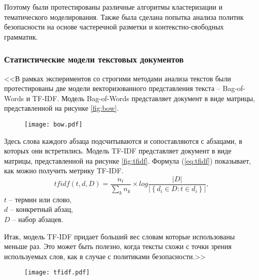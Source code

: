 \documentclass[../main]{subfiles}
\begin{document}
Поэтому были протестированы различные алгоритмы кластеризации и тематического моделирования. Также была сделана попытка анализа политик безопасности на основе частеречной разметки и контекстно-свободных грамматик.

\subsubsection{Статистические модели текстовых документов}

<<В рамках экспериментов со строгими методами анализа текстов были протестированы две модели векторизованного представления текста -- Bag-of-Words и TF-IDF. Модель Bag-of-Words представляет документ в виде матрицы, представленной на рисунке \ref{fig:bow}. 

\begin{figure}[H]
    \centering
    {\texttt{[image: bow.pdf]}}
    \vspace{-\baselineskip}
\end{figure}

Здесь слова каждого абзаца подсчитываются и сопоставляются с абзацами, в которых они встретились. Модель TF-IDF представляет документ в виде матрицы, представленной на рисунке \ref{fig:tfidf}. Формула (\ref{eq:tfidf}) показывает, как можно получить метрику TF-IDF.
\begin{equation}
    \label{eq:tfidf}
    tfidf(t, d, D) = \frac{n_t}{\displaystyle\sum_k n_k} \times 
    log \frac{ \big|{D}\big| }
    { \big|\left\{ d_i \in D : t \in d_i \right\}\big| },
\end{equation}
$t$ -- термин или слово,\\
\makebox[1.25cm]{}$d$ -- конкретный абзац,\\
\makebox[1.25cm]{}$D$ -- набор абзацев. 

Итак, модель TF-IDF придает больший вес словам которые использованы меньше раз. Это может быть полезно, когда тексты схожи с точки зрения используемых слов, как в случае с политиками безопасности.>> \cite{LETI}

\begin{figure}[H]
    \centering
    {\texttt{[image: tfidf.pdf]}}
    \vspace{-\baselineskip}
\end{figure}
\end{document}
